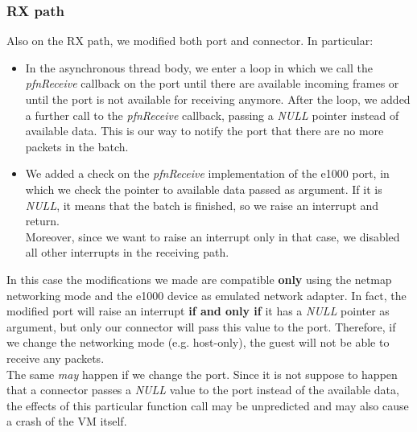 \documentclass[a4paper, 12pt, titlepage]{report}
\begin{document}
\subsubsection{RX path}
Also on the RX path, we modified both port and connector. In particular:
\begin{itemize}
\item In the asynchronous thread body, we enter a loop in which we call the \textit{pfnReceive} callback on the port until there are available incoming frames or until the port is not available for receiving anymore. After the loop, we added a further call to the \textit{pfnReceive} callback, passing a \textit{NULL} pointer instead of available data. This is our way to notify the port that there are no more packets in the batch.
\item We added a check on the \textit{pfnReceive} implementation of the e1000 port, in which we check the pointer to available data passed as argument. If it is \textit{NULL}, it means that the batch is finished, so we raise an interrupt and return.
\\
Moreover, since we want to raise an interrupt only in that case, we disabled all other interrupts in the receiving path. 
\end{itemize}
In this case the modifications we made are compatible \textbf{only} using the netmap networking mode and the e1000 device as emulated network adapter. In fact, the modified port will raise an interrupt \textbf{if and only if} it has a \textit{NULL} pointer as argument, but only our connector will pass this value to the port. Therefore, if we change the networking mode (e.g. host-only), the guest will not be able to receive any packets.
\\
The same \textit{may} happen if we change the port. Since it is not suppose to happen that a connector passes a \textit{NULL} value to the port instead of the available data, the effects of this particular function call may be unpredicted and may also cause a crash of the VM itself.
\end{document}
